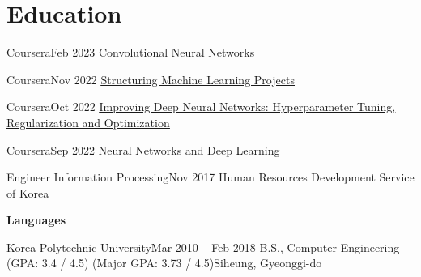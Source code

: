 \section{Education}
    \resumeSubHeadingListStart

    \resumeSubheading
    {Coursera}{Feb 2023}
    {\href{https://www.coursera.org/account/accomplishments/certificate/CBYK8RJU62RS}{\underline{Convolutional Neural Networks}}}{}

    \resumeSubheading
    {Coursera}{Nov 2022}
    {\href{https://www.coursera.org/account/accomplishments/certificate/RDPPP2ZNG25Q}{\underline{Structuring Machine Learning Projects}}}{}

    \resumeSubheading
    {Coursera}{Oct 2022}
    {\href{https://www.coursera.org/account/accomplishments/certificate/C8A3QU5RGZX9}{\underline{Improving Deep Neural Networks: Hyperparameter Tuning, Regularization and Optimization}}}{}

    \resumeSubheading
    {Coursera}{Sep 2022}
    {\href{https://www.coursera.org/account/accomplishments/certificate/JJ3FSYCCK9TZ}{\underline{Neural Networks and Deep Learning}}}{}

    \resumeSubheading
    {Engineer Information Processing}{Nov 2017}
    {Human Resources Development Service of Korea}{}

    \resumeProjectHeading
    {\textbf{Languages}}{}
        \resumeItemListStart
        \resumeItemListEnd
        
    \resumeSubheading
    {Korea Polytechnic University}{Mar 2010 -- Feb 2018}
    {B.S., Computer Engineering (GPA: 3.4 / 4.5) (Major GPA: 3.73 / 4.5)}{Siheung, Gyeonggi-do}
        \resumeItemListStart
        \resumeItemListEnd

    \resumeSubHeadingListEnd
